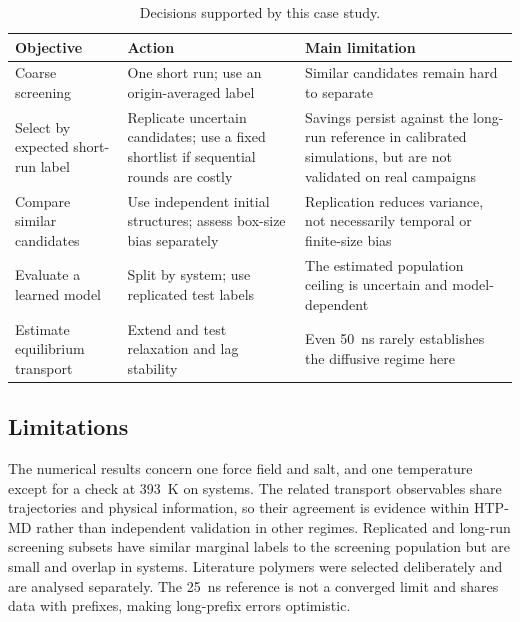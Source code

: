 \documentclass[preprint,12pt]{elsarticle}
\begin{document}
\begin{table}[ht]
\centering
\caption{Decisions supported by this case study.}
\label{tab:guide}
\small\setlength{\tabcolsep}{4pt}
\begin{tabular}{@{}>{\raggedright\arraybackslash}p{}>{\raggedright\arraybackslash}p{}>{\raggedright\arraybackslash}p{}@{}}
\toprule
Objective & Action & Main limitation \\
\midrule
Coarse screening & One short run; use an origin-averaged label & Similar candidates remain hard to separate \\
\addlinespace
Select by expected short-run label & Replicate uncertain candidates; use a fixed shortlist if sequential rounds are costly & Savings persist against the long-run reference in calibrated simulations, but are not validated on real campaigns \\
\addlinespace
Compare similar candidates & Use independent initial structures; assess box-size bias separately & Replication reduces variance, not necessarily temporal or finite-size bias \\
\addlinespace
Evaluate a learned model & Split by system; use replicated test labels & The estimated population ceiling is uncertain and model-dependent \\
\addlinespace
Estimate equilibrium transport & Extend and test relaxation and lag stability & Even \SI{50}{\nano\second} rarely establishes the diffusive regime here \\
\bottomrule
\end{tabular}
\end{table}



\subsection{Limitations}\label{sec:limitations}
The numerical results concern one force field and salt, and one temperature except for a
check at \SI{393}{\kelvin} on \ampTN{} systems. The related transport
observables share trajectories and physical information, so their agreement is evidence within
HTP-MD rather than independent validation in other regimes. Replicated and long-run screening
subsets have similar marginal labels to the screening population but are small and overlap
in \techoEndReprOverlap{} systems. Literature polymers were selected deliberately and are
analysed separately. The \SI{25}{\nano\second} reference is not a converged limit and shares
data with prefixes, making long-prefix errors optimistic.
\end{document}
